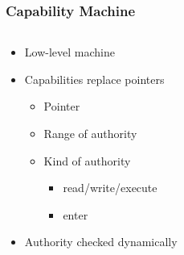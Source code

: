 \documentclass{beamer}
\begin{document}
\begin{frame}
  \frametitle{Capability Machine}

  \begin{columns}
\begin{column}{0.5\textwidth}
  \begin{itemize}
  \item Low-level machine
  \item Capabilities replace pointers
    \begin{itemize}
    \item Pointer
    \item Range of authority
    \item Kind of authority
      \begin{itemize}
      \item read/write/execute
      \item enter
      \end{itemize}
    \end{itemize}
    \item Authority checked dynamically
  \end{itemize}
\end{column}
\begin{column}{0.5\textwidth}
    \begin{center}
     \end{center}
\end{column}
\end{columns}
\end{frame}
\end{document}
